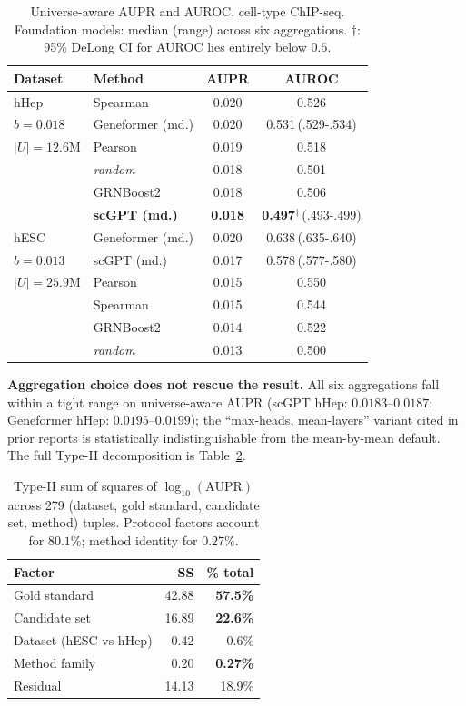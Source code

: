 \documentclass[sigconf, nonacm]{acmart}
\begin{document}
\begin{table}[t]
\caption{Universe-aware AUPR and AUROC, cell-type ChIP-seq.
Foundation models: median (range) across six aggregations.
$\dagger$: 95\% DeLong CI for AUROC lies entirely below $0.5$.}
\label{tab:headline}
\footnotesize
\setlength{\tabcolsep}{4pt}
\begin{tabular}{llcc}
\toprule
Dataset & Method & AUPR & AUROC \\
\midrule
hHep        & Spearman                & 0.020 & 0.526 \\
$b{=}0.018$ & Geneformer (md.)        & 0.020 & 0.531\,(.529-.534) \\
$|U|{=}12.6$M & Pearson               & 0.019 & 0.518 \\
            & \emph{random}           & 0.018 & 0.501 \\
            & GRNBoost2               & 0.018 & 0.506 \\
            & \textbf{scGPT (md.)}    & \textbf{0.018} & \textbf{0.497$^{\dagger}$}\,(.493-.499) \\
\midrule
hESC        & Geneformer (md.)        & 0.020 & 0.638\,(.635-.640) \\
$b{=}0.013$ & scGPT (md.)             & 0.017 & 0.578\,(.577-.580) \\
$|U|{=}25.9$M & Pearson               & 0.015 & 0.550 \\
            & Spearman                & 0.015 & 0.544 \\
            & GRNBoost2               & 0.014 & 0.522 \\
            & \emph{random}           & 0.013 & 0.500 \\
\bottomrule
\end{tabular}
\end{table}

\textbf{Aggregation choice does not rescue the result.} All six
aggregations fall within a tight range on universe-aware AUPR
(scGPT hHep: $0.0183$--$0.0187$; Geneformer hHep:
$0.0195$--$0.0199$); the ``max-heads, mean-layers'' variant cited in
prior reports is statistically indistinguishable from the
mean-by-mean default. The full Type-II decomposition is
Table~\ref{tab:anova}.

\begin{table}[t]
\caption{Type-II sum of squares of $\log_{10}(\text{AUPR})$ across
279 (dataset, gold standard, candidate set, method) tuples. Protocol
factors account for $80.1\%$; method identity for $0.27\%$.}
\label{tab:anova}
\footnotesize
\setlength{\tabcolsep}{6pt}
\begin{tabular}{lrr}
\toprule
Factor & SS & \% total \\
\midrule
Gold standard           & 42.88 & \textbf{57.5\%} \\
Candidate set           & 16.89 & \textbf{22.6\%} \\
Dataset (hESC vs hHep)  & 0.42  & 0.6\% \\
Method family           & 0.20  & \textbf{0.27\%} \\
Residual                & 14.13 & 18.9\% \\
\bottomrule
\end{tabular}
\end{table}
\end{document}
